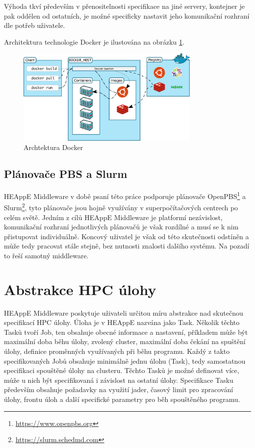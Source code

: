 Výhoda tkví především v přenositelnosti specifikace na jiné servery, kontejner je pak oddělen od ostatních, je možné specificky nastavit jeho komunikační rozhraní dle potřeb uživatele.

Architektura technologie Docker je ilustována na obrázku \ref{fig:docker-architecture}.

\begin{figure}
	\centering
	\includegraphics[width=0.8\textwidth]{Figures/docker-architecture.png}
	\caption{Archtektura Docker \cite{Ued4tuEOQL0cOIeN}}
	\label{fig:docker-architecture}
\end{figure}

\subsection{Plánovače PBS a Slurm}\label{subsection:heappe-support-schedulers}
HEAppE Middleware v době psaní této práce podporuje plánovače OpenPBS\footnote{\href{https://www.openpbs.org}{https://www.openpbs.org}} a Slurm\footnote{\href{https://slurm.schedmd.com}{https://slurm.schedmd.com}}, tyto plánovače jsou hojně využívány v superpočítačových centrech po celém světě. Jedním z cílů HEAppE Middleware je platformí nezávislost, komunikační rozhraní jednotlivých plánovačů je však rozdílné a musí se k nim přistupovat individuálně. Koncový uživatel je však od této skutečnosti odstíněn a může tedy pracovat stále stejně, bez nutnosti znalosti dalšího systému. Na pozadí to řeší samotný middleware.


\section{Abstrakce HPC úlohy}
HEAppE Middleware poskytuje uživateli určitou míru abstrakce nad skutečnou specifikací HPC úlohy. Úloha je v HEAppE nazvána jako Task. Několik těchto Tasků tvoří Job, ten obsahuje obecné informace a nastavení, příkladem může být maximální doba běhu úlohy, zvolený cluster, maximální doba čekání na spuštění úlohy, definice proměnných využívaných při běhu programu. Každý z takto specifikovaných Jobů obsahuje minimálně jednu úlohu (Task), tedy samostatnou specifikaci spouštěné úlohy na clusteru. Těchto Tasků je možné definovat více, může u nich být specifikovaná i závislost na ostatní úlohy. Specifikace Tasku především obsahuje požadavky na využití jader, časový limit pro zpracování úlohy, frontu úloh a další specifické parametry pro běh spouštěného programu.

